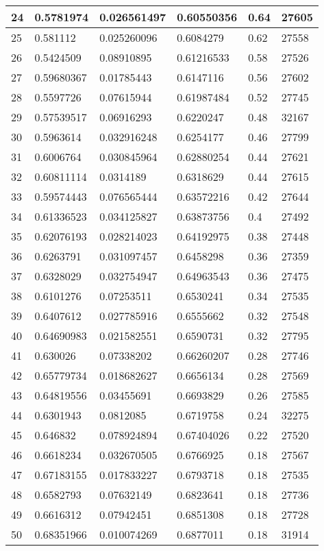 \begin{longtable}{|l|l|l|l|l|l|}
24 & 0.5781974 & 0.026561497 & 0.60550356 & 0.64 & 27605 \\ \hline 
25 & 0.581112 & 0.025260096 & 0.6084279 & 0.62 & 27558 \\ \hline 
26 & 0.5424509 & 0.08910895 & 0.61216533 & 0.58 & 27526 \\ \hline 
27 & 0.59680367 & 0.01785443 & 0.6147116 & 0.56 & 27602 \\ \hline 
28 & 0.5597726 & 0.07615944 & 0.61987484 & 0.52 & 27745 \\ \hline 
29 & 0.57539517 & 0.06916293 & 0.6220247 & 0.48 & 32167 \\ \hline 
30 & 0.5963614 & 0.032916248 & 0.6254177 & 0.46 & 27799 \\ \hline 
31 & 0.6006764 & 0.030845964 & 0.62880254 & 0.44 & 27621 \\ \hline 
32 & 0.60811114 & 0.0314189 & 0.6318629 & 0.44 & 27615 \\ \hline 
33 & 0.59574443 & 0.076565444 & 0.63572216 & 0.42 & 27644 \\ \hline 
34 & 0.61336523 & 0.034125827 & 0.63873756 & 0.4 & 27492 \\ \hline 
35 & 0.62076193 & 0.028214023 & 0.64192975 & 0.38 & 27448 \\ \hline 
36 & 0.6263791 & 0.031097457 & 0.6458298 & 0.36 & 27359 \\ \hline 
37 & 0.6328029 & 0.032754947 & 0.64963543 & 0.36 & 27475 \\ \hline 
38 & 0.6101276 & 0.07253511 & 0.6530241 & 0.34 & 27535 \\ \hline 
39 & 0.6407612 & 0.027785916 & 0.6555662 & 0.32 & 27548 \\ \hline 
40 & 0.64690983 & 0.021582551 & 0.6590731 & 0.32 & 27795 \\ \hline 
41 & 0.630026 & 0.07338202 & 0.66260207 & 0.28 & 27746 \\ \hline 
42 & 0.65779734 & 0.018682627 & 0.6656134 & 0.28 & 27569 \\ \hline 
43 & 0.64819556 & 0.03455691 & 0.6693829 & 0.26 & 27585 \\ \hline 
44 & 0.6301943 & 0.0812085 & 0.6719758 & 0.24 & 32275 \\ \hline 
45 & 0.646832 & 0.078924894 & 0.67404026 & 0.22 & 27520 \\ \hline 
46 & 0.6618234 & 0.032670505 & 0.6766925 & 0.18 & 27567 \\ \hline 
47 & 0.67183155 & 0.017833227 & 0.6793718 & 0.18 & 27535 \\ \hline 
48 & 0.6582793 & 0.07632149 & 0.6823641 & 0.18 & 27736 \\ \hline 
49 & 0.6616312 & 0.07942451 & 0.6851308 & 0.18 & 27728 \\ \hline 
50 & 0.68351966 & 0.010074269 & 0.6877011 & 0.18 & 31914 \\ \hline 
\end{longtable}